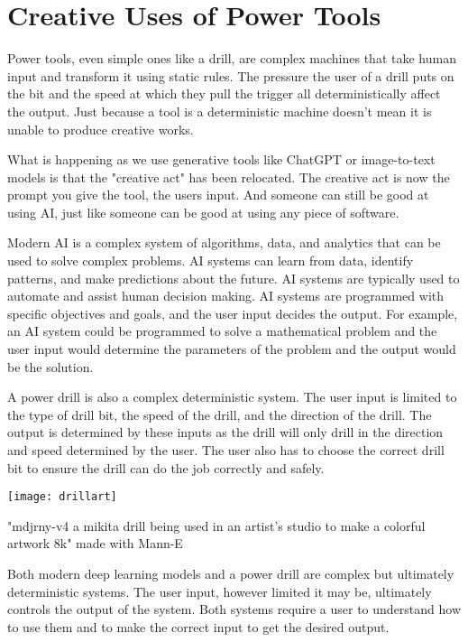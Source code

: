 \section{Creative Uses of Power Tools}

Power tools, even simple ones like a drill, are complex machines that take human input and transform it using static rules. The pressure the user of a drill puts on the bit and the speed at which they pull the trigger all deterministically affect the output. Just because a tool is a deterministic machine doesn't mean it is unable to produce creative works.

What is happening as we use generative tools like ChatGPT or image-to-text models is that the "creative act" has been relocated. The creative act is now the prompt you give the tool, the users input. And someone can still be good at using AI, just like someone can be good at using any piece of software.

Modern AI is a complex system of algorithms, data, and analytics that can be used to solve complex problems. AI systems can learn from data, identify patterns, and make predictions about the future. AI systems are typically used to automate and assist human decision making. AI systems are programmed with specific objectives and goals, and the user input decides the output. For example, an AI system could be programmed to solve a mathematical problem and the user input would determine the parameters of the problem and the output would be the solution.

A power drill is also a complex deterministic system. The user input is limited to the type of drill bit, the speed of the drill, and the direction of the drill. The output is determined by these inputs as the drill will only drill in the direction and speed determined by the user. The user also has to choose the correct drill bit to ensure the drill can do the job correctly and safely.

\begin{pdf}
\begin{marginfigure}[-5.5cm]
        \texttt{[image: drillart]}
        \caption{"mdjrny-v4 a mikita drill being used in an artist's studio to make a colorful artwork 8k" made with Mann-E}
\end{marginfigure}
\end{pdf}

Both modern deep learning models and a power drill are complex but ultimately deterministic systems. The user input, however limited it may be, ultimately controls the output of the system. Both systems require a user to understand how to use them and to make the correct input to get the desired output.

